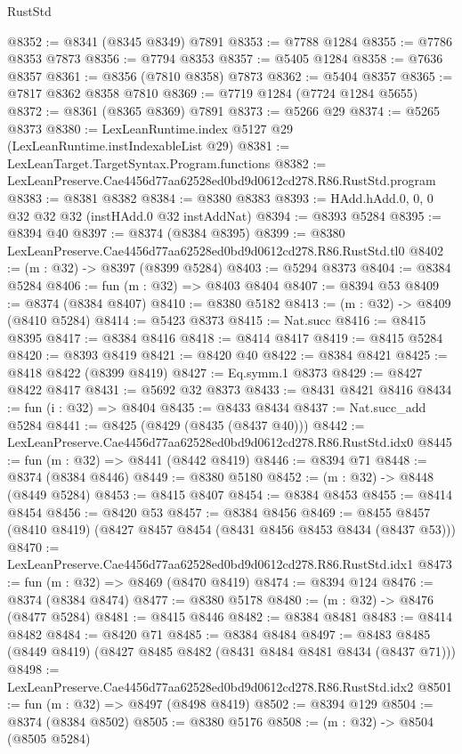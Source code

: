 \begin{lexlean}{RustStd}
\begin{coremodule}
@8352 := @8341 (@8345 @8349) @7891
@8353 := @7788 @1284
@8355 := @7786 @8353 @7873
@8356 := @7794 @8353
@8357 := @5405 @1284
@8358 := @7636 @8357
@8361 := @8356 (@7810 @8358) @7873
@8362 := @5404 @8357
@8365 := @7817 @8362 @8358 @7810
@8369 := @7719 @1284 (@7724 @1284 @5655)
@8372 := @8361 (@8365 @8369) @7891
@8373 := @5266 @29
@8374 := @5265 @8373
@8380 := LexLeanRuntime.index @5127 @29 (LexLeanRuntime.instIndexableList @29)
@8381 := LexLeanTarget.TargetSyntax.Program.functions
@8382 := LexLeanPreserve.Cae4456d77aa62528ed0bd9d0612cd278.R86.RustStd.program
@8383 := @8381 @8382
@8384 := @8380 @8383
@8393 := HAdd.hAdd.{0, 0, 0} @32 @32 @32 (instHAdd.{0} @32 instAddNat)
@8394 := @8393 @5284
@8395 := @8394 @40
@8397 := @8374 (@8384 @8395)
@8399 := @8380 LexLeanPreserve.Cae4456d77aa62528ed0bd9d0612cd278.R86.RustStd.tl0
@8402 := (m : @32) -> @8397 (@8399 @5284)
@8403 := @5294 @8373
@8404 := @8384 @5284
@8406 := fun (m : @32) => @8403 @8404
@8407 := @8394 @53
@8409 := @8374 (@8384 @8407)
@8410 := @8380 @5182
@8413 := (m : @32) -> @8409 (@8410 @5284)
@8414 := @5423 @8373
@8415 := Nat.succ
@8416 := @8415 @8395
@8417 := @8384 @8416
@8418 := @8414 @8417
@8419 := @8415 @5284
@8420 := @8393 @8419
@8421 := @8420 @40
@8422 := @8384 @8421
@8425 := @8418 @8422 (@8399 @8419)
@8427 := Eq.symm.{1} @8373
@8429 := @8427 @8422 @8417
@8431 := @5692 @32 @8373
@8433 := @8431 @8421 @8416
@8434 := fun (i : @32) => @8404
@8435 := @8433 @8434
@8437 := Nat.succ_add @5284
@8441 := @8425 (@8429 (@8435 (@8437 @40)))
@8442 := LexLeanPreserve.Cae4456d77aa62528ed0bd9d0612cd278.R86.RustStd.idx0
@8445 := fun (m : @32) => @8441 (@8442 @8419)
@8446 := @8394 @71
@8448 := @8374 (@8384 @8446)
@8449 := @8380 @5180
@8452 := (m : @32) -> @8448 (@8449 @5284)
@8453 := @8415 @8407
@8454 := @8384 @8453
@8455 := @8414 @8454
@8456 := @8420 @53
@8457 := @8384 @8456
@8469 := @8455 @8457 (@8410 @8419) (@8427 @8457 @8454 (@8431 @8456 @8453 @8434 (@8437 @53)))
@8470 := LexLeanPreserve.Cae4456d77aa62528ed0bd9d0612cd278.R86.RustStd.idx1
@8473 := fun (m : @32) => @8469 (@8470 @8419)
@8474 := @8394 @124
@8476 := @8374 (@8384 @8474)
@8477 := @8380 @5178
@8480 := (m : @32) -> @8476 (@8477 @5284)
@8481 := @8415 @8446
@8482 := @8384 @8481
@8483 := @8414 @8482
@8484 := @8420 @71
@8485 := @8384 @8484
@8497 := @8483 @8485 (@8449 @8419) (@8427 @8485 @8482 (@8431 @8484 @8481 @8434 (@8437 @71)))
@8498 := LexLeanPreserve.Cae4456d77aa62528ed0bd9d0612cd278.R86.RustStd.idx2
@8501 := fun (m : @32) => @8497 (@8498 @8419)
@8502 := @8394 @129
@8504 := @8374 (@8384 @8502)
@8505 := @8380 @5176
@8508 := (m : @32) -> @8504 (@8505 @5284)

\end{coremodule}
\end{lexlean}
